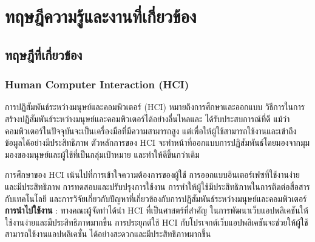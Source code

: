 \chapter{ทฤษฎีความรู้และงานที่เกี่ยวข้อง}



\section{ทฤษฎีที่เกี่ยวข้อง}
\subsection{Human Computer Interaction (HCI)}
การปฏิสัมพันธ์ระหว่างมนุษย์และคอมพิวเตอร์ (HCI)\cite{HCI} หมายถึงการศึกษาและออกแบบ
วิธีการในการสร้างปฏิสัมพันธ์ระหว่างมนุษย์และคอมพิวเตอร์ได้อย่างลื่นไหลและ
ได้รับประสบการณ์ที่ดี แม้ว่าคอมพิวเตอร์ในปัจจุบันจะเป็นเครื่องมือที่มีความสามารถสูง
แต่เพื่อให้ผู้ใช้สามารถใช้งานและเข้าถึงข้อมูลได้อย่างมีประสิทธิภาพ ตัวหลักการของ HCI
จะทำหน้าที่ออกแบบการปฏิสัมพันธ์โดยมองจากมุมมองของมนุษย์และผู้ใช้ที่เป็นกลุ่มเป้าหมาย
และทำให้ดีขึ้นกว่าเดิม
\par การศึกษาของ HCI เน้นไปที่การเข้าใจความต้องการของผู้ใช้
การออกแบบอินเตอร์เฟซที่ใช้งานง่ายและมีประสิทธิภาพ การทดสอบและปรับปรุงการใช้งาน
การทำให้ผู้ใช้มีประสิทธิภาพในการติดต่อสื่อสารกับเทคโนโลยี
และการวิจัยเกี่ยวกับปัญหาที่เกี่ยวข้องกับการปฏิสัมพันธ์ระหว่างมนุษย์และคอมพิวเตอร์ \\
\textbf{การนำไปใช้งาน} : ทางคณะผู้จัดทำได้นำ HCI ที่เป็นศาสตร์ที่สำคัญ
ในการพัฒนาเว็บแอปพลิเคชันให้ใช้งานง่ายและมีประสิทธิภาพมากขึ้น
การประยุกต์ใช้ HCI กับโปรเจกต์เว็บแอปพลิเคชันจะช่วยให้ผู้ใช้สามารถใช้งานแอปพลิเคชั่น
ได้อย่างสะดวกและมีประสิทธิภาพมากขึ้น
